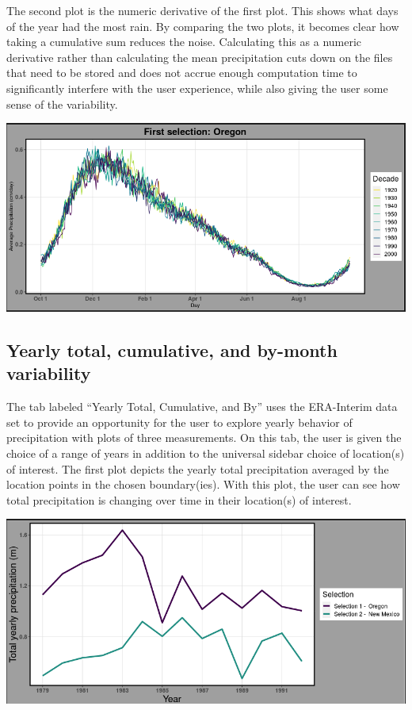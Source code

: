 \documentclass[10pt,letterpaper]{article}
\begin{document}
The second plot is the numeric derivative of the first plot. This shows what days of the year had the most rain. By comparing the two plots, it becomes clear how taking a cumulative sum reduces the noise. Calculating this as a numeric derivative rather than calculating the mean precipitation cuts down on the files that need to be stored and does not accrue enough computation time to significantly interfere with the user experience, while also giving the user some sense of the variability.

\begin{center}
  \includegraphics[width = .8\textwidth]{graphics/derivative}
\end{center}

\subsection*{Yearly total, cumulative, and by-month variability}

The tab labeled “Yearly Total, Cumulative, and By” uses the ERA-Interim data set to provide an opportunity for the user to explore yearly behavior of precipitation with plots of three measurements. On this tab, the user is given the choice of a range of years in addition to the universal sidebar choice of location(s) of interest. The first plot depicts the yearly total precipitation averaged by the location points in the chosen boundary(ies). With this plot, the user can see how total precipitation is changing over time in their location(s) of interest.

\begin{center}
  \includegraphics[width = .8\textwidth]{graphics/total}
\end{center}
\end{document}

